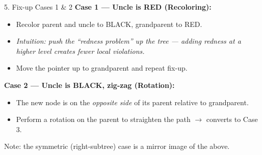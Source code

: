 \documentclass{beamer}
\begin{document}
\begin{frame}{5. Fix-up Cases 1 \& 2}
\textbf{Case 1 --- Uncle is RED (Recoloring):}
\begin{itemize}
    \item Recolor parent and uncle to BLACK, grandparent to RED.
    \item \textit{Intuition: push the ``redness problem'' up the tree --- adding redness at a higher level creates fewer local violations.}
    \item Move the pointer up to grandparent and repeat fix-up.
\end{itemize}

\vspace{0.2em}
\pause
\textbf{Case 2 --- Uncle is BLACK, zig-zag (Rotation):}
\begin{itemize}
    \item The new node is on the \emph{opposite side} of its parent relative to grandparent.
    \item Perform a rotation on the parent to straighten the path $\rightarrow$ converts to Case 3.
\end{itemize}

\vspace{0.2em}
\begin{center}
\end{center}

\footnotesize{Note: the symmetric (right-subtree) case is a mirror image of the above.}
\end{frame}
\end{document}
